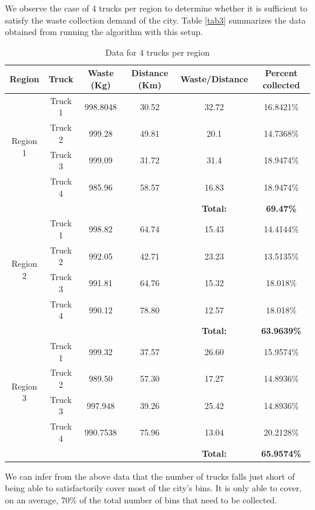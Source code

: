 \documentclass[12pt]{article}
\begin{document}
We observe the case of 4 trucks per region to determine whether it is sufficient to satisfy the waste collection demand of the city. Table \ref{tab3} summarizes the data obtained from running the algorithm with this setup.
\begin{table}[H]
    \centering
    \caption{ Data for 4 trucks per region} \label{tab2}
    \vspace*{0.3cm}
    \begin{tabular}{|c|c|c|c|c|c|}
        \hline Region & Truck & Waste (Kg) & Distance (Km) & Waste/Distance & Percent collected \\
        \hline \multirow{4}{*}{Region 1} & Truck 1 & 998.8048& 30.52 &32.72  &16.8421\% \\
        \cline{2-6}& Truck 2 &999.28&49.81&20.1&14.7368\%\\        
        \cline{2-6}& Truck 3 &999.09&31.72&31.4&18.9474\%\\        
        \cline{2-6}& Truck 4 &985.96&58.57&16.83&18.9474\%\\
        \hline & & & &\textbf{Total:} &\textbf{69.47\%}\\
        \hline \multirow{4}{*}{Region 2} & Truck 1 &998.82 &64.74  & 15.43  &14.4144\% \\
        \cline{2-6}& Truck 2 &992.05&42.71&23.23&13.5135\%\\        
        \cline{2-6}& Truck 3 &991.81&64.76&15.32&18.018\%\\        
        \cline{2-6}& Truck 4 &990.12&78.80&12.57&18.018\%\\
        \hline & & & &\textbf{Total:} &\textbf{63.9639\%}\\     
        \hline \multirow{4}{*}{Region 3} & Truck 1 &999.32  &37.57  &26.60  &15.9574\% \\
        \cline{2-6}& Truck 2 &989.50&57.30&17.27&14.8936\%\\        
        \cline{2-6}& Truck 3 &997.948&39.26&25.42&14.8936\%\\        
        \cline{2-6}& Truck 4 &990.7538&75.96&13.04&20.2128\%\\
        \hline & & & &\textbf{Total:} &\textbf{65.9574\%}\\
        \hline      
    \end{tabular}
\end{table}

We can infer from the above data that the number of trucks falls just short of being able to satisfactorily cover most of the city's bins. It is only able to cover, on an average, 70\% of the total number of bins that need to be collected.
\end{document}
